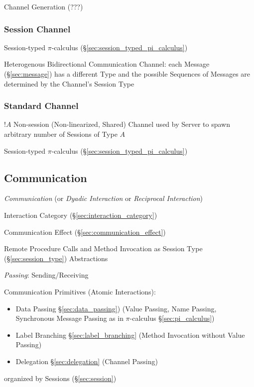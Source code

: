 Channel Generation (???)



\subsubsection{Session Channel}\label{sec:session_channel}

Session-typed $\pi$-calculus (\S\ref{sec:session_typed_pi_calculus})

Heterogenous Bidirectional Communication Channel: each Message
(\S\ref{sec:message}) has a different Type and the possible Sequences
of Messages are determined by the Channel's Session Type
\cite{neubauer-thiemann04}



\subsubsection{Standard Channel}\label{sec:standard_channel}

$!A$ Non-session (Non-linearized, Shared) Channel used by Server to
spawn arbitrary number of Sessions of Type $A$

Session-typed $\pi$-calculus (\S\ref{sec:session_typed_pi_calculus})



\subsection{Communication}\label{sec:communication}

\emph{Communication} (or \emph{Dyadic Interaction} or \emph{Reciprocal
  Interaction})

Interaction Category (\S\ref{sec:interaction_category})

Communication Effect (\S\ref{sec:communication_effect})

Remote Procedure Calls and Method Invocation as Session Type
(\S\ref{sec:session_type}) Abstractions
\cite{honda-vasconcelos-kubo98}

\emph{Passing}: Sending/Receiving

Communication Primitives (Atomic Interactions):
\cite{honda-vasconcelos-kubo98}
\begin{itemize}
  \item Data Passing \S\ref{sec:data_passing}) (Value Passing, Name
    Passing, Synchronous Message Passing as in $\pi$-calculus
    \S\ref{sec:pi_calculus})
  \item Label Branching \S\ref{sec:label_branching} (Method Invocation
    without Value Passing)
  \item Delegation \S\ref{sec:delegation} (Channel Passing)
\end{itemize}
organized by Sessions (\S\ref{sec:session})


